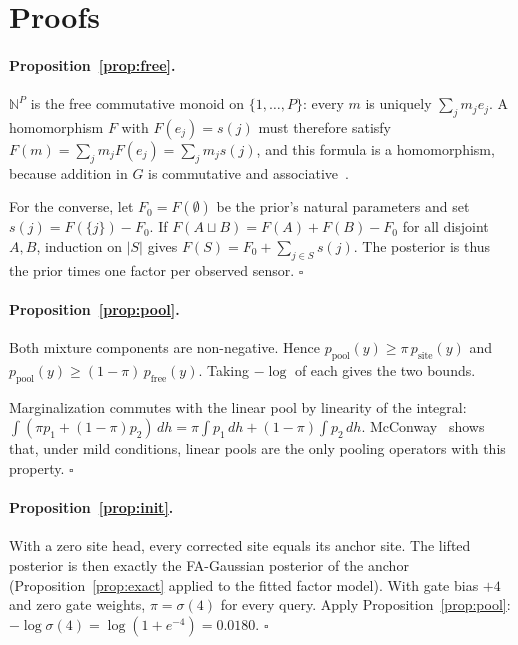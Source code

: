 \section{Proofs}
\label{app:proofs}

\paragraph{Proposition~\ref{prop:free}.}
$\mathbb{N}^P$ is the free commutative monoid on $\{1,\dots,P\}$: every $m$ is uniquely $\sum_j m_je_j$. A homomorphism
$F$ with $F(e_j)=s(j)$ must therefore satisfy $F(m)=\sum_jm_jF(e_j)=\sum_jm_js(j)$, and this formula is a
homomorphism, because addition in $G$ is commutative and associative~\citep{maclane1998categories}.

For the converse, let $F_0=F(\emptyset)$ be the prior's natural parameters and set $s(j)=F(\{j\})-F_0$. If
$F(A\sqcup B)=F(A)+F(B)-F_0$ for all disjoint $A,B$, induction on $|S|$ gives $F(S)=F_0+\sum_{j\in S}s(j)$. The
posterior is thus the prior times one factor per observed sensor. \hfill$\square$

\paragraph{Proposition~\ref{prop:pool}.}
Both mixture components are non-negative. Hence
$p_{\mathrm{pool}}(y)\geq\pi\,p_{\mathrm{site}}(y)$ and $p_{\mathrm{pool}}(y)\geq(1-\pi)\,p_{\mathrm{free}}(y)$.
Taking $-\log$ of each gives the two bounds.

Marginalization commutes with the linear pool by linearity of the integral:
$\int(\pi p_1+(1-\pi)p_2)\,dh=\pi\int p_1\,dh+(1-\pi)\int p_2\,dh$. McConway~\citep{mcconway1981marginalization} shows
that, under mild conditions, linear pools are the only pooling operators with this property. \hfill$\square$

\paragraph{Proposition~\ref{prop:init}.}
With a zero site head, every corrected site equals its anchor site. The lifted posterior is then exactly the FA-Gaussian
posterior of the anchor (Proposition~\ref{prop:exact} applied to the fitted factor model). With gate bias $+4$ and zero
gate weights, $\pi=\sigma(4)$ for every query. Apply Proposition~\ref{prop:pool}:
$-\log\sigma(4)=\log(1+e^{-4})=0.0180$. \hfill$\square$

